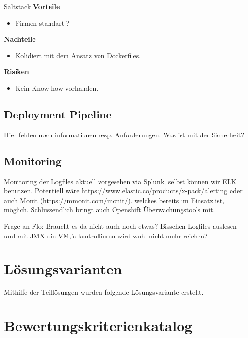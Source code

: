 Saltstack\newline
\newline
\textbf{Vorteile}
\begin{itemize}
	\item Firmen standart ?
\end{itemize}
\textbf{Nachteile}
\begin{itemize}
	\item Kolidiert mit dem Ansatz von Dockerfiles.
\end{itemize}
\textbf{Risiken}
\begin{itemize}
	\item Kein Know-how vorhanden.
\end{itemize}

\subsection{Deployment Pipeline}

Hier fehlen noch informationen resp. Anforderungen. Was ist mit der Sicherheit?

\subsection{Monitoring}

Monitoring der Logfiles aktuell vorgesehen via Splunk, selbst können wir ELK benutzen. Potentiell wäre https://www.elastic.co/products/x-pack/alerting oder auch Monit (https://mmonit.com/monit/), welches bereits im Einsatz ist, möglich. Schlussendlich bringt auch Openshift Überwachungstools mit.

Frage an Flo: Braucht es da nicht auch noch etwas? Bisschen Logfiles auslesen und mit JMX die VM,'s kontrollieren wird wohl nicht mehr reichen?

\section{Lösungsvarianten}

Mithilfe der Teillösungen wurden folgende Lösungsvariante erstellt. 

\section{Bewertungskriterienkatalog}

